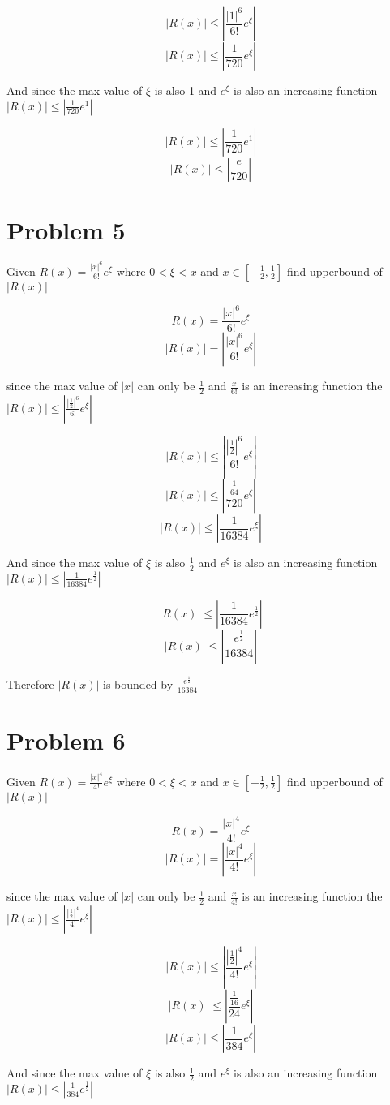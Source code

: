 \documentclass[]{article}
\begin{document}
	\[|R(x)| \le |\frac{|1|^6}{6!}e^\xi|\]
	\[|R(x)| \le |\frac{1}{720}e^\xi|\]
	
	And since the max value of $\xi$ is also 1 and $e^\xi$ is also an increasing function $|R(x)| \le |\frac{1}{720}e^1|$
	
	\[|R(x)| \le |\frac{1}{720}e^1|\]
	\[|R(x)| \le |\frac{e}{720}|\]
	
	\section*{Problem 5}
	
		Given $R(x) = \frac{|x|^6}{6!}e^\xi$ where $0 < \xi < x$ and $x \in [-\frac{1}{2},\frac{1}{2}]$ find upperbound of $|R(x)|$
	
	\[R(x) = \frac{|x|^6}{6!}e^\xi\]
	\[|R(x)| = |\frac{|x|^6}{6!}e^\xi|\]
	
	since the max value of $|x|$ can only be $\frac{1}{2}$ and $\frac{x}{6!}$ is an increasing function the $|R(x)| \le |\frac{|\frac{1}{2}|^6}{6!}e^\xi|$
	
	\[|R(x)| \le |\frac{|\frac{1}{2}|^6}{6!}e^\xi|\]
	\[|R(x)| \le |\frac{\frac{1}{64}}{720}e^\xi|\]
	\[|R(x)| \le |\frac{1}{16384}e^\xi|\]
	
	And since the max value of $\xi$ is also $\frac{1}{2}$ and $e^\xi$ is also an increasing function $|R(x)| \le |\frac{1}{16384}e^{\frac{1}{2}}|$
	
	\[|R(x)| \le |\frac{1}{16384}e^{\frac{1}{2}}|\]
	\[|R(x)| \le |\frac{e^{\frac{1}{2}}}{16384}|\]
	
	Therefore $|R(x)|$ is bounded by $\frac{e^{\frac{1}{2}}}{16384}$
	
	
		\section*{Problem 6}
	
	Given $R(x) = \frac{|x|^4}{4!}e^\xi$ where $0 < \xi < x$ and $x \in [-\frac{1}{2},\frac{1}{2}]$ find upperbound of $|R(x)|$
	
	\[R(x) = \frac{|x|^4}{4!}e^\xi\]
	\[|R(x)| = |\frac{|x|^4}{4!}e^\xi|\]
	
	since the max value of $|x|$ can only be $\frac{1}{2}$ and $\frac{x}{4!}$ is an increasing function the $|R(x)| \le |\frac{|\frac{1}{2}|^4}{4!}e^\xi|$
	
	\[|R(x)| \le |\frac{|\frac{1}{2}|^4}{4!}e^\xi|\]
	\[|R(x)| \le |\frac{\frac{1}{16}}{24}e^\xi|\]
	\[|R(x)| \le |\frac{1}{384}e^\xi|\]
	
	And since the max value of $\xi$ is also $\frac{1}{2}$ and $e^\xi$ is also an increasing function $|R(x)| \le |\frac{1}{384}e^{\frac{1}{2}}|$
	
\end{document}
